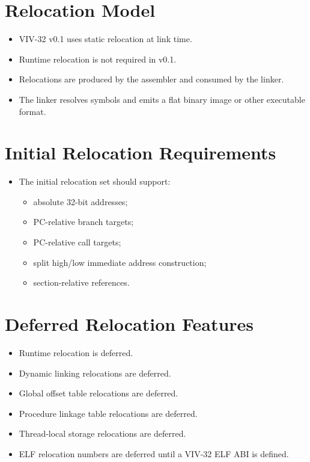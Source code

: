\section{Relocation Model}

\begin{itemize}
  \item VIV-32 v0.1 uses static relocation at link time.
  \item Runtime relocation is not required in v0.1.
  \item Relocations are produced by the assembler and consumed by the linker.
  \item The linker resolves symbols and emits a flat binary image or other executable format.
\end{itemize}

\section{Initial Relocation Requirements}

\begin{itemize}
  \item The initial relocation set should support:
  \begin{itemize}
    \item absolute 32-bit addresses;
    \item PC-relative branch targets;
    \item PC-relative call targets;
    \item split high/low immediate address construction;
    \item section-relative references.
  \end{itemize}
\end{itemize}

\section{Deferred Relocation Features}

\begin{itemize}
  \item Runtime relocation is deferred.
  \item Dynamic linking relocations are deferred.
  \item Global offset table relocations are deferred.
  \item Procedure linkage table relocations are deferred.
  \item Thread-local storage relocations are deferred.
  \item ELF relocation numbers are deferred until a VIV-32 ELF ABI is defined.
\end{itemize}

